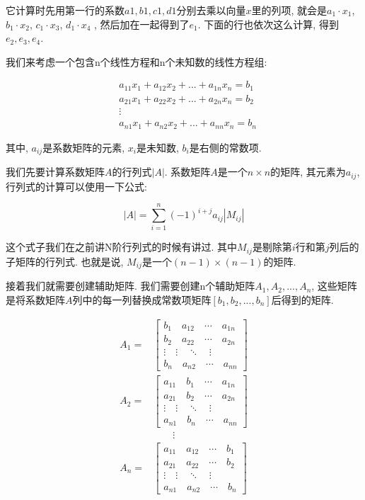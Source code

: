它计算时先用第一行的系数${a1, b1, c1, d1}$分别去乘以向量$x$里的列项, 就会是$a_1 \cdot x_1$, $b_1 \cdot x_2$, $c_1 \cdot x_3$, $d_1 \cdot x_4$ , 然后加在一起得到了$e_1$. 下面的行也依次这么计算, 得到$e_2 ,e_3 ,e_4 $. 

我们来考虑一个包含n个线性方程和n个未知数的线性方程组: 

\begin{align*}
  & a_{11}x_1 + a_{12}x_2 + ... + a_{1n}x_n = b_1 \\
  & a_{21}x_1 + a_{22}x_2 + ... + a_{2n}x_n = b_2 \\
  & \vdots \\
  & a_{n1}x_1 + a_{n2}x_2 + ... + a_{nn}x_n = b_n
\end{align*}

其中, $a_{ij}$是系数矩阵的元素, $x_i$是未知数, $b_i$是右侧的常数项. 

我们先要计算系数矩阵$A$的行列式$|A|$. 系数矩阵$A$是一个$n \times n$的矩阵, 其元素为$a_{ij}$, 行列式的计算可以使用一下公式:

\[
  |A| = \sum_{i=1}^n(-1)^{i+j}a_{ij}|M_{ij}|
\]

这个式子我们在之前讲N阶行列式的时候有讲过. 其中$M_{ij}$是剔除第$i$行和第$j$列后的子矩阵的行列式. 也就是说, $M_{ij}$是一个$(n-1) \times (n-1)$的矩阵. 

接着我们就需要创建辅助矩阵. 我们需要创建n个辅助矩阵$A_1,A_2,..., A_n$, 这些矩阵是将系数矩阵$A$列中的每一列替换成常数项矩阵$[b_1,b_2,..., b_n]$后得到的矩阵. 

\begin{align*}
  A_1 =
  & \begin{bmatrix}
  b_1 \quad a_{12} \quad \cdots \quad a_{1n} \\
  b_2 \quad a_{22} \quad \cdots \quad a_{2n} \\
  \vdots \quad \vdots \quad \ddots \quad \vdots \\
  b_n \quad a_{n2} \quad \cdots \quad a_{nn}
  \end{bmatrix} \\
  A_2 =
  & \begin{bmatrix}
  a_{11} \quad b_1 \quad \cdots \quad a_{1n} \\
  a_{21} \quad b_2 \quad \cdots \quad a_{2n} \\
  \vdots \quad \vdots \quad \ddots \quad \vdots \\
  a_{n1} \quad b_n \quad \cdots \quad a_{nn}
  \end{bmatrix} \\
  & \qquad \vdots\\
  A_n =
  & \begin{bmatrix}
  a_{11} \quad a_{12} \quad \cdots \quad b_1 \\
  a_{21} \quad a_{22} \quad \cdots \quad b_2 \\
  \vdots \quad \vdots \quad \ddots \quad \vdots \\
  a_{n1} \quad a_{n2} \quad \cdots \quad b_n
  \end{bmatrix} \\
\end{align*}

